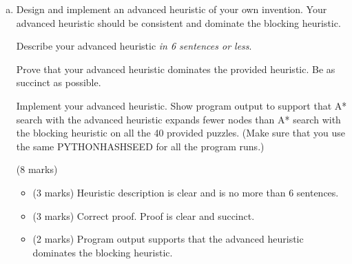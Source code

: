 \documentclass[12pt]{article}
\begin{document}
\begin{enumerate}[(a)]
\item
Design and implement an advanced heuristic of your own invention. Your advanced heuristic should be consistent and dominate the blocking heuristic.

Describe your advanced heuristic \textit{in 6 sentences or less}.

Prove that your advanced heuristic dominates the provided heuristic. Be as succinct as possible.

Implement your advanced heuristic. Show program output to support that A* search with the advanced heuristic expands fewer nodes than A* search with the blocking heuristic on all the 40 provided puzzles. (Make sure that you use the same PYTHONHASHSEED for all the program runs.)

\begin{markscheme}
(8 marks)

\begin{itemize}
\item (3 marks) Heuristic description is clear and is no more than 6 sentences.
\item (3 marks) Correct proof. Proof is clear and succinct.
\item (2 marks) Program output supports that the advanced heuristic dominates the blocking heuristic. 
\end{itemize}

\end{markscheme}

\end{enumerate}
\end{document}
